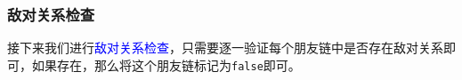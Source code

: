 \documentclass[../mainReport.tex]{subfiles} %
\begin{document}

\subsubsection{敌对关系检查}
接下来我们进行\textcolor{blue}{敌对关系检查}，只需要逐一验证每个朋友链中是否存在敌对关系即可，如果存在，那么将这个朋友链标记为\verb|false|即可。







\end{document}

